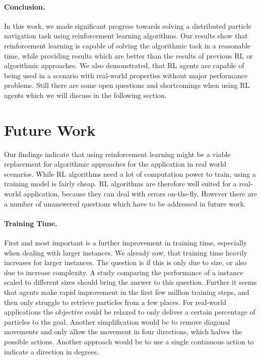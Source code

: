 \paragraph{Conclusion.} In this work, we made significant progress towards solving a distributed particle navigation task using reinforcement learning algorithms. Our results show that reinforcement learning is capable of solving the algorithmic task in a reasonable time, while providing results which are better than the results of previous RL or algorithmic approaches. We also demonstrated, that RL agents are capable of being used in a scenario with real-world properties without major performance problems. Still there are some open questions and shortcomings when using RL agents which we will discuss in the following section.  

\section{Future Work} \label{sec:FutureWork}
Our findings indicate that using reinforcement learning might be a viable replacement for algorithmic approaches for the application in real world scenarios. While RL algorithms need a lot of computation power to train, using a training model is fairly cheap. RL algorithms are therefore well suited for a real-world application, because they can deal with errors on-the-fly. However there are a number of unanswered questions which have to be addressed in future work.

\paragraph{Training Time.}
First and most important is a further improvement in training time, especially when dealing with larger instances. We already saw, that training time heavily increases for larger instances. The question is if this is only due to size, or also due to increase complexity. A study comparing the performance of a instance scaled to different sizes should bring the answer to this question. Further it seems that agents make rapid improvement in the first few million training steps, and then only struggle to retrieve particles from a few places. For real-world applications the objective could be relaxed to only deliver a certain percentage of particles to the goal. Another simplification would be to remove diagonal movements and only allow the movement in four directions, which halves the possible actions. Another approach would be to use a single continuous action to indicate a direction in degrees.

